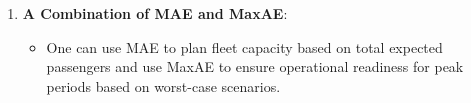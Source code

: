 \documentclass{article}
\begin{document}
\begin{enumerate}
\[
\text{MaxAE} = \max(|A_t - F_t|) \quad \text{for } t = 1, 2, \ldots, n
\]

\begin{itemize}
\item
  \textbf{Advantage:} It captures the worst-case scenario in terms of
  forecasting error. This is particularly critical for human resource
  planning.
\end{itemize}
\item \textbf{A Combination of MAE and MaxAE}:

  \begin{itemize}
      \item One can use MAE to plan fleet capacity based on total expected passengers and use MaxAE to ensure operational readiness for peak periods based on worst-case scenarios.
  \end{itemize}
  
\end{enumerate}
\end{document}
